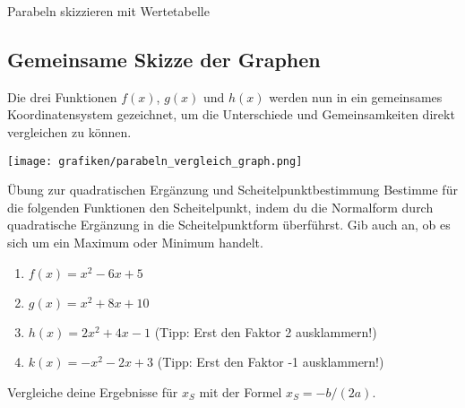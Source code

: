 \begin{loesungsumgebung}{Parabeln skizzieren mit Wertetabelle}
\subsection*{Gemeinsame Skizze der Graphen}
Die drei Funktionen $f(x)$, $g(x)$ und $h(x)$ werden nun in ein gemeinsames Koordinatensystem gezeichnet, um die Unterschiede und Gemeinsamkeiten direkt vergleichen zu können.

\begin{center}
\texttt{[image: grafiken/parabeln\_vergleich\_graph.png]}
\label{fig:parabeln_vergleich}
\end{center}

\end{loesungsumgebung}


\begin{aufgabenumgebung}{Übung zur quadratischen Ergänzung und Scheitelpunktbestimmung}
Bestimme für die folgenden Funktionen den Scheitelpunkt, indem du die Normalform durch quadratische Ergänzung in die Scheitelpunktform überführst. Gib auch an, ob es sich um ein Maximum oder Minimum handelt.
\begin{enumerate}
    \item $f(x) = x^2 - 6x + 5$
    \item $g(x) = x^2 + 8x + 10$
    \item $h(x) = 2x^2 + 4x - 1$ (Tipp: Erst den Faktor 2 ausklammern!)
    \item $k(x) = -x^2 - 2x + 3$ (Tipp: Erst den Faktor -1 ausklammern!)
\end{enumerate}
Vergleiche deine Ergebnisse für $x_S$ mit der Formel $x_S = -b/(2a)$.
\end{aufgabenumgebung}

